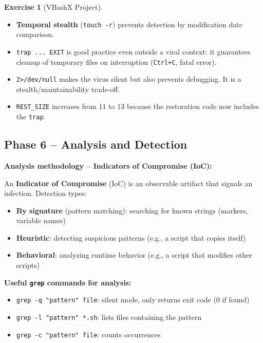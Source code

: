 \documentclass[a4paper,11pt]{article}
\theoremstyle{plain}
\theoremstyle{definition}
\newtheorem{exercice}{Exercise}
\begin{document}
\begin{exercice}[VBashX Project]
\begin{correction}
\begin{pointcle}
\begin{itemize}
    \item \textbf{Temporal stealth} (\texttt{touch -r}) prevents detection by modification date comparison.
    \item \texttt{trap ... EXIT} is good practice even outside a viral context: it guarantees cleanup of temporary files on interruption (\texttt{Ctrl+C}, fatal error).
    \item \texttt{2>/dev/null} makes the virus silent but also prevents debugging. It is a stealth/maintainability trade-off.
    \item \texttt{REST\_SIZE} increases from 11 to 13 because the restoration code now includes the \texttt{trap}.
\end{itemize}
\end{pointcle}

\end{correction}



\subsection*{Phase 6 -- Analysis and Detection}

\begin{rappel}
\textbf{Analysis methodology -- Indicators of Compromise (IoC):}

An \textbf{Indicator of Compromise} (IoC) is an observable artifact that signals an infection. Detection types:
\begin{itemize}
    \item \textbf{By signature} (pattern matching): searching for known strings (markers, variable names)
    \item \textbf{Heuristic}: detecting suspicious patterns (e.g., a script that copies itself)
    \item \textbf{Behavioral}: analyzing runtime behavior (e.g., a script that modifies other scripts)
\end{itemize}

\textbf{Useful \texttt{grep} commands for analysis:}
\begin{itemize}
    \item \texttt{grep -q "pattern" file}: silent mode, only returns exit code (0 if found)
    \item \texttt{grep -l "pattern" *.sh}: lists files containing the pattern
    \item \texttt{grep -c "pattern" file}: counts occurrences
\end{itemize}
\end{rappel}


\end{exercice}
\end{document}
